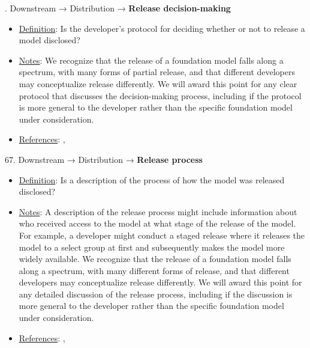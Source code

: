 . Downstream → Distribution → \textbf{Release decision-making}
\vspace{-\parskip}
\begin{itemize}
	\item
	\underline{Definition}: Is the developer’s protocol for deciding whether or not to release a model disclosed?
	\item
	\underline{Notes}: We recognize that the release of a foundation model falls along a spectrum, with many forms of partial release, and that different developers may conceptualize release differently. We will award this point for any clear protocol that discusses the decision-making process, including if the protocol is more general to the developer rather than the specific foundation model under consideration.
	\item
	\underline{References}: \citet{solaiman2023gradient}, \citet{liang2022community-norms}
\end{itemize} \vspace{\baselineskip}


67. Downstream → Distribution → \textbf{Release process}
\vspace{-\parskip}
\begin{itemize}
	\item
	\underline{Definition}: Is a description of the process of how the model was released disclosed?
	\item
	\underline{Notes}: A description of the release process might include information about who received access to the model at what stage of the release of the model. For example, a developer might conduct a staged release where it releases the model to a select group at first and subsequently makes the model more widely available. We recognize that the release of a foundation model falls along a spectrum, with many different forms of release, and that different developers may conceptualize release differently. We will award this point for any detailed discussion of the release process, including if the discussion is more general to the developer rather than the specific foundation model under consideration.
	\item
	\underline{References}: \citet{solaiman2023gradient}, \citet{liang2022community-norms}
\end{itemize} \vspace{\baselineskip}


